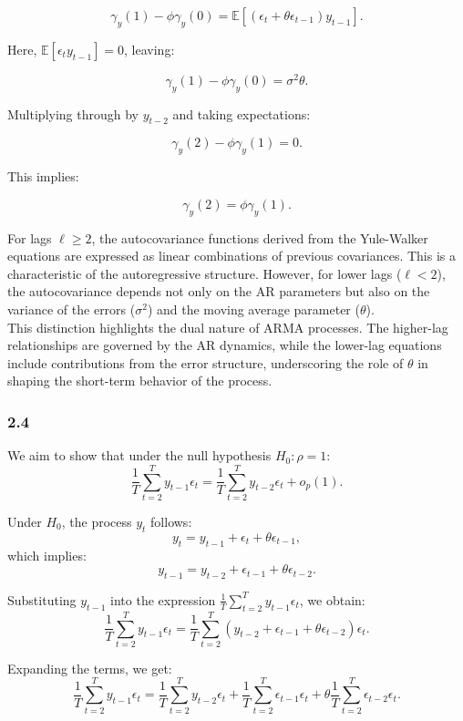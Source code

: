 \documentclass{article}
\begin{document}
\[
\gamma_{y}(1) - \phi\gamma_{y}(0) = \mathbb{E}[(\epsilon_{t} + \theta \epsilon_{t-1}) y_{t-1}].
\]

Here, $\mathbb{E}[\epsilon_t y_{t-1}] = 0$, leaving:

\[
\gamma_{y}(1) - \phi\gamma_{y}(0) = \sigma^{2}\theta.
\]


Multiplying through by $y_{t-2}$ and taking expectations:

\[
\gamma_{y}(2) - \phi\gamma_{y}(1) = 0.
\]

This implies:

\[
\gamma_{y}(2) = \phi\gamma_{y}(1).
\]

For lags $\ell \geq 2$, the autocovariance functions derived from the Yule-Walker equations are expressed as linear combinations of previous covariances. This is a characteristic of the autoregressive structure. However, for lower lags ($\ell < 2$), the autocovariance depends not only on the AR parameters but also on the variance of the errors ($\sigma^{2}$) and the moving average parameter ($\theta$). \\

This distinction highlights the dual nature of ARMA processes. The higher-lag relationships are governed by the AR dynamics, while the lower-lag equations include contributions from the error structure, underscoring the role of $\theta$ in shaping the short-term behavior of the process.

\subsubsection*{2.4}

We aim to show that under the null hypothesis \( H_0: \rho = 1 \):
\[
\frac{1}{T} \sum_{t=2}^T y_{t-1} \epsilon_t = \frac{1}{T} \sum_{t=2}^T y_{t-2} \epsilon_t + o_p(1).
\]

Under \( H_0 \), the process \( y_t \) follows:
\[
y_t = y_{t-1} + \epsilon_t + \theta \epsilon_{t-1},
\]
which implies:
\[
y_{t-1} = y_{t-2} + \epsilon_{t-1} + \theta \epsilon_{t-2}.
\]

Substituting \( y_{t-1} \) into the expression \( \frac{1}{T} \sum_{t=2}^T y_{t-1} \epsilon_t \), we obtain:
\[
\frac{1}{T} \sum_{t=2}^T y_{t-1} \epsilon_t = \frac{1}{T} \sum_{t=2}^T (y_{t-2} + \epsilon_{t-1} + \theta \epsilon_{t-2}) \epsilon_t.
\]

Expanding the terms, we get:
\[
\frac{1}{T} \sum_{t=2}^T y_{t-1} \epsilon_t = \frac{1}{T} \sum_{t=2}^T y_{t-2} \epsilon_t + \frac{1}{T} \sum_{t=2}^T \epsilon_{t-1} \epsilon_t + \theta \frac{1}{T} \sum_{t=2}^T \epsilon_{t-2} \epsilon_t.
\]
\end{document}

